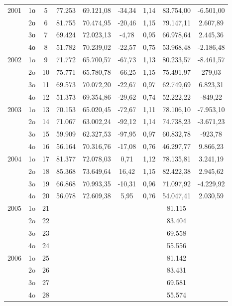 \begin{table} [h]
\begin{center}
\begin{tabular}{|c|c|c|c|c|c|c|c|c|}
        2001   & 1ο & 5  & 77.253  & 69.121,08  & -34,34 & 1,14 & 83.754,00 & -6.501,00\\
        & 2ο & 6 & 81.755 & 70.474,95 & -20,46  & 1,15 & 79.147,11 &2.607,89 \\
        & 3ο & 7  &69.424  & 72.023,13 & -4,78 & 0,95 &66.978,64 & 2.445,36 \\
        & 4ο &8  & 51.782 & 70.239,02 & -22,57 & 0,75 & 53.968,48 & -2.186,48\\
     2002   & 1o & 9 & 71.772 & 65.700,57 & -67,73 & 1,13 & 80.233,57 & -8.461,57 \\
     & 2o  & 10 & 75.771 & 65.780,78 & -66,25 & 1,15 & 75.491,97 & 279,03\\
     & 3o & 11 & 69.573 & 70.072,20 & -22,67 & 0,97 & 62.749,69 & 6.823,31\\
     & 4o & 12 & 51.373 & 69.354,86 & -29,62 & 0,74 &52.222,22 & -849,22\\
   2003  & 1o & 13 &70.153  & 65.020,45 & -72,67 & 1,11  &78.106,10 &-7.953,10\\
     & 2o & 14 &71.067 & 63.002,24 & -92,12 & 1,14& 74.738,23 & -3.671,23\\
     & 3o & 15 & 59.909  & 62.327,53 & -97,95  & 0,97 & 60.832,78 & -923,78\\
      & 4o & 16 & 56.164 & 70.316,76 & -17,08 & 0,76 & 46.297,77 & 9.866,23\\
      2004& 1o &  17& 81.377 & 72.078,03 & 0,71 & 1,12 & 78.135,81 &3.241,19 \\
      & 2o & 18 & 85.368 & 73.649,64  & 16,42 & 1,15 & 82.422,38 &2.945,62 \\
      & 3o &19  & 66.868 & 70.993,35 & -10,31 & 0,96 &71.097,92 &-4.229,92 \\
      & 4o & 20 & 56.078 & 72.609,38 & 5,95 & 0,76 &54.047,41 & 2.030,59\\
      2005 & 1o  & 21 &  &  &  &  &81.115  &  \\
      & 2o & 22 &  &  &  &  & 83.404  &  \\
      & 3o & 23 &  &  &  &  & 69.558 &  \\
      & 4o & 24 &  &  &  &  & 55.556  &  \\
      2006& 1o & 25 &  &  &  &  & 81.142 &  \\
      & 2o &26  &  &  &  &  & 83.431 &  \\
      & 3o & 27 &  &  &  &  &69.581  &  \\
      & 4o & 28 &  &  &  &  & 55.574 &  \\
     
      \hline
    \end{tabular}
  \end{center}
\end{table}
